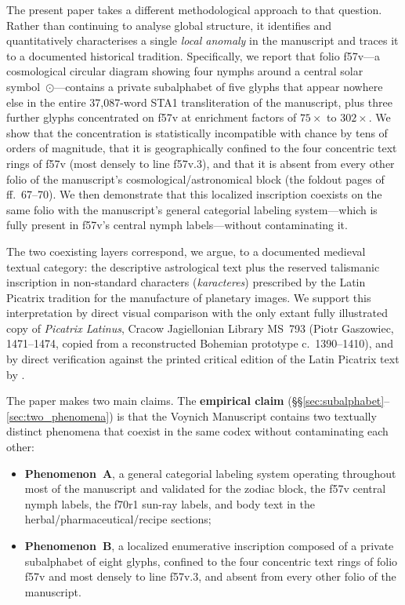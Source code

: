 The present paper takes a different methodological approach to that
question. Rather than continuing to analyse global structure, it
identifies and quantitatively characterises a single \emph{local
anomaly} in the manuscript and traces it to a documented historical
tradition. Specifically, we report that folio f57v---a cosmological
circular diagram showing four nymphs around a central solar
symbol~$\odot$---contains a private subalphabet of five glyphs that
appear nowhere else in the entire 37,087-word STA1 transliteration of
the manuscript, plus three further glyphs concentrated on f57v at
enrichment factors of $75\times$ to $302\times$. We show that the
concentration is statistically incompatible with chance by tens of
orders of magnitude, that it is geographically confined to the four
concentric text rings of f57v (most densely to line f57v.3), and that
it is absent from every other folio of the manuscript's
cosmological/astronomical block (the foldout pages of ff.~67--70). We
then demonstrate that this localized inscription coexists on the same
folio with the manuscript's general categorial labeling system---which
is fully present in f57v's central nymph labels---without contaminating
it.

The two coexisting layers correspond, we argue, to a documented
medieval textual category: the descriptive astrological text plus the
reserved talismanic inscription in non-standard characters
(\textit{karacteres}) prescribed by the Latin Picatrix tradition for
the manufacture of planetary images. We support this interpretation by
direct visual comparison with the only extant fully illustrated copy of
\textit{Picatrix Latinus}, Cracow Jagiellonian Library MS~793 (Piotr
Gaszowiec, 1471--1474, copied from a reconstructed Bohemian prototype
c.~1390--1410), and by direct verification against the printed
critical edition of the Latin Picatrix text by \citet{pingree1986}.

The paper makes two main claims. The \textbf{empirical claim}
(\S\S\ref{sec:subalphabet}--\ref{sec:two_phenomena}) is that the
Voynich Manuscript contains two textually distinct phenomena that
coexist in the same codex without contaminating each other:

\begin{itemize}[itemsep=0pt,topsep=2pt]
\item \textbf{Phenomenon~A}, a general categorial labeling system
operating throughout most of the manuscript and validated for the
zodiac block, the f57v central nymph labels, the f70r1 sun-ray
labels, and body text in the herbal/pharmaceutical/recipe sections;
\item \textbf{Phenomenon~B}, a localized enumerative inscription
composed of a private subalphabet of eight glyphs, confined to the
four concentric text rings of folio f57v and most densely to line
f57v.3, and absent from every other folio of the manuscript.
\end{itemize}

